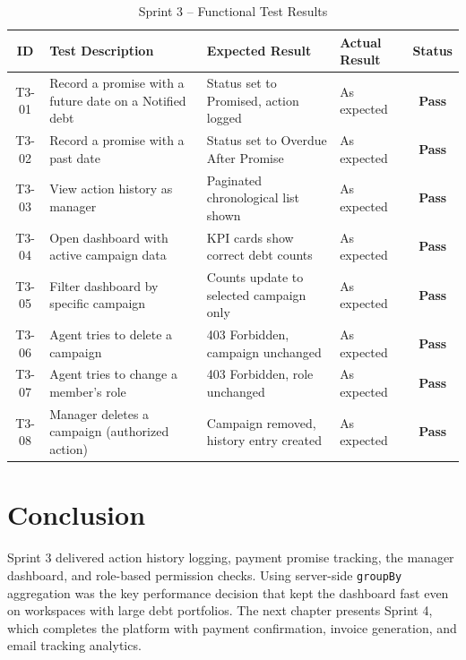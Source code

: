 \documentclass[12pt,a4paper]{report}
\newcommand{\tpass}{\textcolor{passgreen}{\textbf{Pass}}}
\begin{document}
\begin{table}[H]
  \centering
  \renewcommand{\arraystretch}{1.3}
  \begin{tabular}{|c|p{4.8cm}|p{4.2cm}|p{2cm}|c|}
    \hline
    \textbf{ID} & \textbf{Test Description} & \textbf{Expected Result} & \textbf{Actual Result} & \textbf{Status} \\
    \hline
    T3-01 & Record a promise with a future date on a Notified debt  & Status set to Promised, action logged        & As expected & \tpass \\
    \hline
    T3-02 & Record a promise with a past date                       & Status set to Overdue After Promise          & As expected & \tpass \\
    \hline
    T3-03 & View action history as manager                          & Paginated chronological list shown           & As expected & \tpass \\
    \hline
    T3-04 & Open dashboard with active campaign data                & KPI cards show correct debt counts           & As expected & \tpass \\
    \hline
    T3-05 & Filter dashboard by specific campaign                   & Counts update to selected campaign only      & As expected & \tpass \\
    \hline
    T3-06 & Agent tries to delete a campaign                        & 403 Forbidden, campaign unchanged            & As expected & \tpass \\
    \hline
    T3-07 & Agent tries to change a member's role                  & 403 Forbidden, role unchanged                & As expected & \tpass \\
    \hline
    T3-08 & Manager deletes a campaign (authorized action)          & Campaign removed, history entry created      & As expected & \tpass \\
    \hline
  \end{tabular}
  \caption{Sprint 3 -- Functional Test Results}
  \label{tab:test-s3}
\end{table}

\section*{Conclusion}
{}

Sprint 3 delivered action history logging, payment promise tracking, the manager
dashboard, and role-based permission checks.
Using server-side \texttt{groupBy} aggregation was the key performance decision
that kept the dashboard fast even on workspaces with large debt portfolios.
The next chapter presents Sprint 4, which completes the platform with payment
confirmation, invoice generation, and email tracking analytics.
\end{document}
